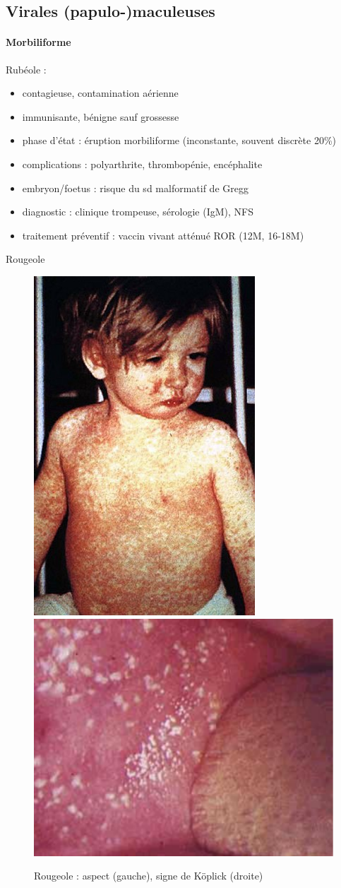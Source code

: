 \documentclass{article}
\begin{document}
\subsection{Virales (papulo-)maculeuses}

\paragraph{Morbiliforme}

Rubéole :

\begin{itemize}
\item contagieuse, contamination aérienne \item immunisante, bénigne sauf grossesse
\item phase d'état : éruption morbiliforme (inconstante, souvent discrète 20\%)
\item complications : polyarthrite, thrombopénie, encéphalite \item embryon/foetus : risque du sd malformatif de Gregg
\item diagnostic : clinique trompeuse, sérologie (IgM), NFS\\ \item traitement préventif : vaccin vivant atténué ROR (12M, 16-18M)
\end{itemize} 
Rougeole

\begin{figure}[htpb]
  \centering
  \caption{Rougeole : aspect (gauche), signe de Köplick (droite)}
  \includegraphics[width=0.3\linewidth]{160_rougeole}
  \includegraphics[width=0.5\linewidth]{160_rougeole_koplik.pdf}
\end{figure}
\end{document}
